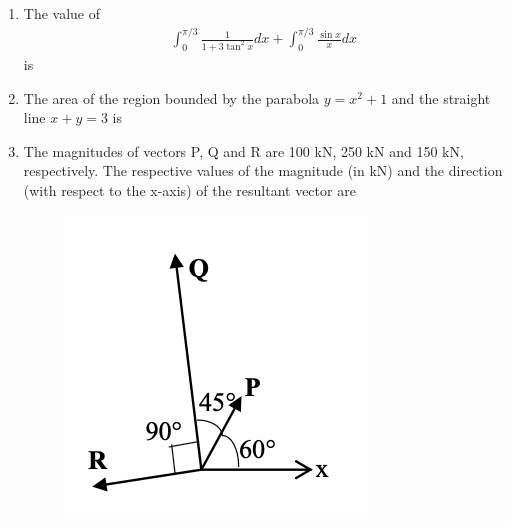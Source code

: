\documentclass[journal]{IEEEtran}
\begin{document}
\begin{enumerate}[resume]
\item The value of 
\begin{align}
\int_{0}^{\pi/3} \frac{1}{1+3\tan^2x} dx + \int_{0}^{\pi/3} \frac{\sin x}{x} dx
\end{align}
is \hfill {}
\begin{enumerate}
\end{enumerate}

\item The area of the region bounded by the parabola $y = x^2 + 1$ and the straight line $x + y = 3$ is \hfill {}
\begin{enumerate}
\end{enumerate}

\item The magnitudes of vectors P, Q and R are 100 kN, 250 kN and 150 kN, respectively. The respective values of the magnitude (in kN) and the direction (with respect to the x-axis) of the resultant vector are \hfill {}

\begin{figure}[H]
    \centering
    \includegraphics[width=0.6\columnwidth]{figs/Q39.png} 
    \caption{}
    \label{fig:placeholder}
\end{figure}


\end{enumerate}
\end{document}
